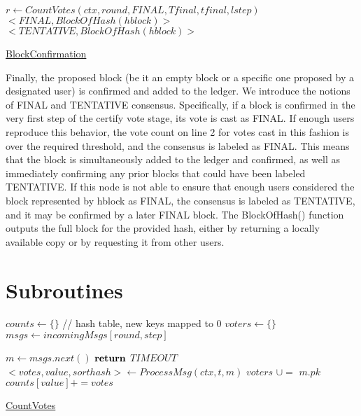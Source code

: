 \documentclass[10pt,a4paper]{article}
\begin{document}
\begin{algorithm}
    \begin{algorithmic}[H]

    \State $r \gets CountVotes(ctx, round, FINAL, Tfinal, tfinal, lstep)$
        \State \Return $<FINAL, BlockOfHash(hblock)>$ 
    \Else
    {
        \State \Return $<TENTATIVE, BlockOfHash(hblock)>$
    }
    \EndIf
        
    \EndFunction
    \end{algorithmic}
    \caption{\underline{BlockConfirmation}}
\end{algorithm}



Finally, the proposed block (be it an empty block or a specific one proposed by a designated user) is confirmed and added to the ledger.
We introduce the notions of FINAL and TENTATIVE consensus.
Specifically, if a block is confirmed in the very first step of the certify vote stage, its vote is cast as FINAL.
If enough users reproduce this behavior, the vote count on line 2 for votes cast in this fashion is over the required threshold, and the consensus is labeled as FINAL.
This means that the block is simultaneously added to the ledger and confirmed, as well as immediately confirming any prior blocks that could have been labeled TENTATIVE.
If this node is not able to ensure that enough users considered the block represented by hblock as FINAL, the consensus is labeled as TENTATIVE, and it may be confirmed by a later FINAL block.
The BlockOfHash() function outputs the full block for the provided hash, either by returning a locally available copy or by requesting it from other users.\



\section{Subroutines}


\begin{algorithm}
    \begin{algorithmic}[H]

    \State $counts \gets \{\}$ // hash table, new keys mapped to 0
    \State $voters \gets \{\}$
    \State $msgs \gets incomingMsgs[round,step]$

        \State $m \gets msgs.next()$
                \State $\Return$ $TIMEOUT$
            \EndIf
        \Else
        {
            \State $<votes, value, sorthash> \gets ProcessMsg(ctx, t, m)$
            \State $voters$ $\cup=$ ${m.pk}$
            \State $counts[value] += votes$
        }
        \EndIf

    \EndWhile

    \end{algorithmic}
    \caption{\underline{CountVotes}}
\end{algorithm}
\end{document}
